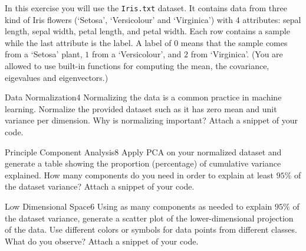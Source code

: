 \newif\ifvimbug
\vimbugfalse

\ifvimbug

\fi

In this exercise you will use the \texttt{Iris.txt} dataset. It contains data from three kind of Iris flowers (`Setosa', `Versicolour' and `Virginica') with 4 attributes: sepal length, sepal width, petal length, and petal width. Each row contains a sample while the last attribute is the label. A label of $0$ means that the sample comes from a `Setosa' plant, $1$ from a `Versicolour', and $2$ from `Virginica'.
(You are allowed to use built-in functions for computing the mean, the covariance, eigevalues and eigenvectors.)

\begin{questions}


\begin{question}{Data Normalization}{4}
Normalizing the data is a common practice in machine learning. Normalize the provided dataset such as it has zero mean and unit variance per dimension. Why is normalizing important?
Attach a snippet of your code. 

\begin{answer}\end{answer}

\end{question}


\begin{question}{Principle Component Analysis}{8}
Apply PCA on your normalized dataset and generate a table showing the proportion (percentage) of cumulative variance explained. 
How many components do you need in order to explain at least $95\%$ of the dataset variance? 
Attach a snippet of your code.

\begin{answer}\end{answer}

\end{question}


\begin{question}{Low Dimensional Space}{6}
Using as many components as needed to explain $95\%$ of the dataset variance, generate a scatter plot of the lower-dimensional projection of the data. Use different colors or symbols for data points from different classes. 
What do you observe? Attach a snippet of your code.


\end{question}
\end{questions}
